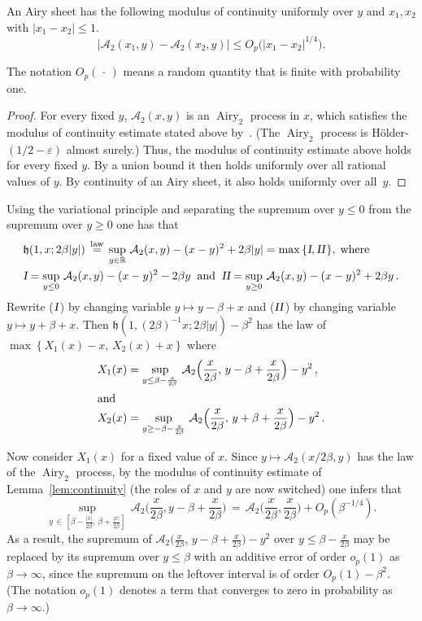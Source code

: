 \documentclass[AHL,Unicode,longabstracts]{cedram}
\newcommand*{\I}{\textsl{I}}
\newcommand*{\II}{\textsl{II}} %
\DeclareMathOperator{\airy}{Airy}
\newcommand{\eps}{\varepsilon}
\newcommand{\R}{\mathbb{R}}
\newcommand{\A}{\mathcal{A}}
\newcommand{\h}{\mathfrak{h}}
\newcommand*{\MK}{\mkern 2mu}
\begin{document}
\begin{lemm} \label{lem:continuity}
An Airy sheet has the following modulus of continuity uniformly over $y$ and $x_1, x_2$ with $|x_1-x_2| \leq 1$.
\[
\big | \A_2(x_1,y) - \A_2(x_2,y) \big | \leq O_p\big(|x_1-x_2|^{1/4}\big).
\]
\end{lemm}
The notation $O_p({\,\cdot\,})$ means a random quantity that is finite with probability one.

\begin{proof}
For every fixed $y$, $\A_2(x,y)$ is an $\airy_2$ process in $x$, which satisfies the modulus of continuity estimate stated above by~\cite[Theorem~4.4]{MQR}. (The $\airy_2$ process is H\"older-$(1/2 - \eps)$ almost surely.) Thus, the modulus of continuity estimate above holds for every fixed $y$. By a union bound it then holds uniformly over all rational values of $y$. By continuity of an Airy sheet, it also holds uniformly over all~$y$.
\end{proof}

Using the variational principle and separating the supremum over $y \leq 0$ from the supremum over $y \geq 0$ one has that
\begin{align*}
& \h(1,x; 2\beta|y|) \,\overset{\text{law}}{=} \,\sup_{y \in \R}\, \A_2(x,y) - (x-y)^2 + 2\beta|y| = \max\, \{ \I, \II\MK \}, \;\text{where}\\
& \I = \sup_{y \leq 0}\, \A_2(x,y) - (x-y)^2 - 2\beta y \;\;\text{and}\;\; \II = \sup_{y \geq 0}\, \A_2(x,y) - (x-y)^2 + 2\beta y \,.
\end{align*}
Rewrite ($\I\MK$) by changing variable $y \mapsto y - \beta + x$ and ($\II\MK$) by changing variable $y \mapsto y + \beta +x$. Then $\h(1, (2 \beta)^{-1} x; 2\beta |y|) - \beta^2 $ has the law of $\max \left \{ X_1(x) - x, \, X_2(x) + x \right \}$ where
\begin{align*}
X_1(x) &= \sup_{y \leq \beta -\frac{x}{2\beta}}\, \A_2 \Big(\frac{x}{2\beta}, \, y-\beta+\frac{x}{2\beta}\Big) -y^2 \,,\\
\intertext{and}
X_2(x) &= \sup_{y \geq -\beta -\frac{x}{2\beta}}\, \A_2 \Big(\frac{x}{2\beta}, \, y+\beta+\frac{x}{2\beta}\Big) -y^2 \,.
\end{align*}

Now consider $X_1(x)$ for a fixed value of $x$. Since $y \mapsto \A_2(x/2\beta, y)$ has the law of the $\airy_2$ process, by the modulus of continuity estimate of Lemma~\ref{lem:continuity} (the roles of $x$ and $y$ are now switched) one infers that
\[
\sup_{y \, \in \, \left [\beta - \frac{|x|}{2\beta}, \, \beta + \frac{|x|}{2\beta} \right]}\, \A_2\Big(\frac{x}{2\beta}, y-\beta+\frac{x}{2\beta}\Big)\,
= \, \A_2\Big(\frac{x}{2\beta}, \frac{x}{2\beta}\Big) + O_p(\beta^{-1/4}).
\]
As a result, the supremum of $\A_2 \Big(\frac{x}{2\beta}, \, y-\beta+\frac{x}{2\beta}\Big) -y^2$ over $y \leq \beta -\frac{x}{2\beta}$ may be replaced by its supremum over $y \leq \beta$ with an additive error of order $o_p(1)$ as $\beta \to \infty$, since the supremum on the leftover interval is of order $O_p(1) - \beta^2$. (The notation $o_p(1)$ denotes a term that converges to zero in probability as $\beta \to \infty$.)
\end{document}
